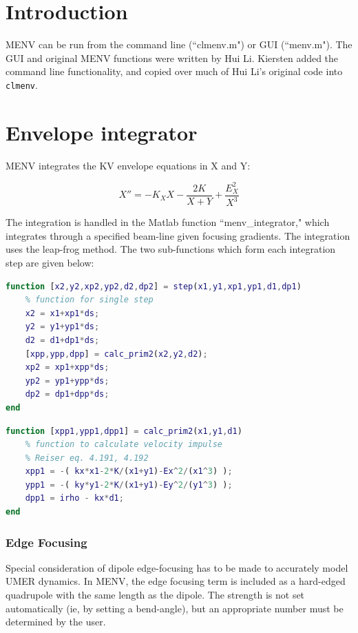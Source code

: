 \documentclass[../menv_main.tex]{subfiles}
\begin{document}
\section{Introduction}

MENV can be run from the command line (``clmenv.m") or GUI (``menv.m"). The GUI and original MENV functions were written by Hui Li. Kiersten added the command line functionality, and copied over much of Hui Li's original code into \verb|clmenv|. 

\section{Envelope integrator}

MENV integrates the KV envelope equations in X and Y:

\begin{equation}
X''=-K_X X - \frac{2\mathit{K}}{X+Y} + \frac{E_X^2}{X^3}
\end{equation}

The integration is handled in the Matlab function ``menv\_integrator," which integrates through a specified beam-line given focusing gradients. The integration uses the leap-frog method. The two sub-functions which form each integration step are given below:

\begin{lstlisting}[language=Matlab]
function [x2,y2,xp2,yp2,d2,dp2] = step(x1,y1,xp1,yp1,d1,dp1)
	% function for single step
	x2 = x1+xp1*ds;
	y2 = y1+yp1*ds;
	d2 = d1+dp1*ds;
	[xpp,ypp,dpp] = calc_prim2(x2,y2,d2);
	xp2 = xp1+xpp*ds;
	yp2 = yp1+ypp*ds;
	dp2 = dp1+dpp*ds;
end
\end{lstlisting}

\begin{lstlisting}[language=Matlab]
function [xpp1,ypp1,dpp1] = calc_prim2(x1,y1,d1)
	% function to calculate velocity impulse
	% Reiser eq. 4.191, 4.192
	xpp1 = -( kx*x1-2*K/(x1+y1)-Ex^2/(x1^3) );
	ypp1 = -( ky*y1-2*K/(x1+y1)-Ey^2/(y1^3) );
	dpp1 = irho - kx*d1;
end
\end{lstlisting}

\subsubsection{Edge Focusing}

Special consideration of dipole edge-focusing has to be made to accurately model UMER dynamics. In MENV, the edge focusing term is included as a hard-edged quadrupole with the same length as the dipole. The strength is not set automatically (ie, by setting a bend-angle), but an appropriate number must be determined by the user. 
 
\end{document}
